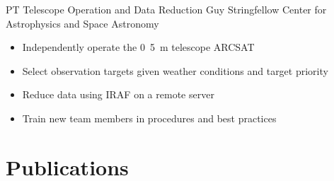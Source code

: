 \documentclass[11pt]{article} %
\begin{document}
{PT} %
{Telescope Operation and Data Reduction} %
{Guy Stringfellow} %
{Center for Astrophysics and Space Astronomy}
{\begin{itemize}
\setlength\itemsep{0.1em}
\item Independently operate the \si{0.5\meter} telescope ARCSAT
\item Select observation targets given weather conditions and target priority
\item Reduce data using IRAF on a remote server
\item Train new team members in procedures and best practices
\end{itemize}
}


\pagebreak[3]
\section{Publications}








\end{document}
